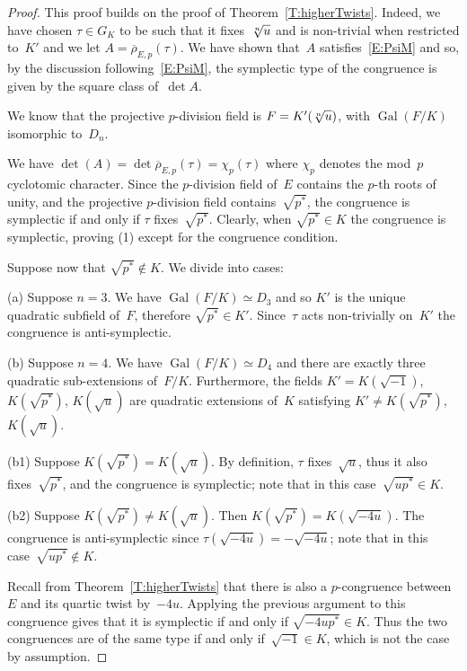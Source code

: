 \documentclass[twoside,leqno,symbols-for-thanks, draft]{rmi}
\numberwithin{equation}{section}
\newcommand{\rhobar}{{\overline{\rho}}}
\DeclareMathOperator{\Gal}{Gal}
\theoremstyle{remark}
\begin{document}
\begin{proof}
This proof builds on the proof of Theorem~\ref{T:higherTwists}.
Indeed, we have chosen $\tau\in G_K$ to be such that it fixes~$\root n\of u$ and 
is non-trivial when restricted to~$K'$ and 
we let $A = \rhobar_{E,p}(\tau)$. We have shown that~$A$ satisfies~\eqref{E:PsiM} and so, by the discussion following~\eqref{E:PsiM}, 
the symplectic type of the congruence is given by the square class of~$\det A$. 

We know that the projective $p$-division field is $F = K'(\root n \of
u)$, with $\Gal(F/K)$ isomorphic to~$D_n$.

We have $\det(A)=\det\rhobar_{E,p}(\tau)=\chi_p(\tau)$ where $\chi_p$ denotes the mod~$p$ cyclotomic character.  Since 
the $p$-division field of~$E$ contains the $p$-th roots of unity, and
the projective $p$-division field contains~$\sqrt{p^*}$, the
congruence is symplectic 
if and only if $\tau$ fixes~$\sqrt{p^*}$.
Clearly, when $\sqrt{p^*}\in K$ the congruence is symplectic, proving (1) except for the congruence condition.

Suppose now that $\sqrt{p^*}\notin K$.
We divide into cases:

(a) Suppose $n=3$. 
We have $\Gal(F/K) \simeq D_3$ and so $K'$ is the unique quadratic subfield of~$F$, therefore $\sqrt{p^*} \in K'$. Since~$\tau$ acts non-trivially on~$K'$ the congruence is anti-symplectic.

(b) Suppose $n=4$. We have $\Gal(F/K) \simeq D_4$ and there are exactly three quadratic sub-extensions of~$F/K$.
Furthermore, the fields 
$K'=K(\sqrt{-1})$, $K(\sqrt{p^*})$, $K(\sqrt{u})$ 
are quadratic extensions of~$K$ satisfying
$K' \neq K(\sqrt{p^*})$, $K(\sqrt{u})$. 

(b1) Suppose $K(\sqrt{p^*})=K(\sqrt{u})$.  By definition, $\tau$
fixes~$\sqrt{u}$, thus it also fixes~$\sqrt{p^*}$, and the congruence
is symplectic; note that in this case~$\sqrt{up^*} \in K$.
 
(b2) Suppose $K(\sqrt{p^*}) \neq K(\sqrt{u})$. Then
$K(\sqrt{p^*})=K(\sqrt{-4u})$.  The congruence is anti-symplectic
since $\tau(\sqrt{-4u}) = - \sqrt{-4u}$; note that in this
case~$\sqrt{up^*} \not\in K$.

Recall from Theorem~\ref{T:higherTwists} that there is also a
$p$-congruence between~$E$ and its quartic twist by~$-4u$. Applying
the previous argument to this congruence gives that it is symplectic
if and only if $\sqrt{-4up^*} \in K$. Thus the two congruences are of
the same type if and only if~$\sqrt{-1} \in K$, which is not the case
by assumption.


\end{proof}
\end{document}
